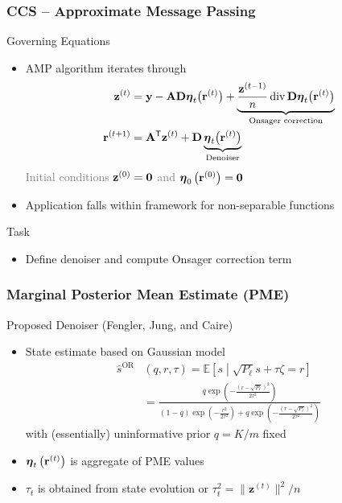 \begin{frame}
\frametitle{CCS -- Approximate Message Passing}
\begin{block}{Governing Equations}
\begin{itemize}
\item AMP algorithm iterates through
\begin{align*}
\mathbf{z}^{(t)} &= \mathbf{y} - \mathbf{A} \mathbf{D} \boldsymbol{\eta}_t \big( \mathbf{r}^{(t)} \big)
+ \underbrace{\frac{\mathbf{z}^{(t-1)}}{n} \operatorname{div} \mathbf{D} \boldsymbol{\eta}_t \big( \mathbf{r}^{(t)} \big)}_{\text{Onsager correction}} \\
\mathbf{r}^{(t+1)} &= \mathbf{A}^{\mathsf{T}} \mathbf{z}^{(t)} + \mathbf{D}
\underbrace{\boldsymbol{\eta}_t \big( \mathbf{r}^{(t)} \big)}_{\text{Denoiser}}
\end{align*}
\textcolor{gray}{Initial conditions $\mathbf{z}^{(0)} = \mathbf{0}$ and $\boldsymbol{\eta}_0 \left( \mathbf{r}^{(0)} \right) = \mathbf{0}$}
\item Application falls within framework for non-separable functions
\end{itemize}
\end{block}
\vfill
\begin{exampleblock}{Task}
\begin{itemize}
\item Define denoiser and compute Onsager correction term
\end{itemize}
\end{exampleblock}
\end{frame}


\begin{frame}
\frametitle{Marginal Posterior Mean Estimate (PME)}
\begin{block}{Proposed Denoiser (Fengler, Jung, and Caire)}
\begin{itemize}
\item State estimate based on Gaussian model
\begin{equation*}
\begin{split}
\hat{s}^{\mathrm{OR}} & \left( q, r, \tau \right)
= \mathbb{E} \left[ s \middle| \sqrt{P_{\ell}} s + \tau \zeta = r \right] \\
&= \frac{q \exp \left( - \frac{ \left( r - \sqrt{P_{\ell}} \right)^2}{2 \tau^2} \right)}
{(1-q) \exp \left( -\frac{r^2}{2 \tau^2} \right)
+ q \exp \left( - \frac{ \left( r - \sqrt{P_{\ell}} \right)^2}{2 \tau^2} \right)}
\end{split}
\end{equation*}
with (essentially) uninformative prior $q = K/m$ fixed
\item $\boldsymbol{\eta}_t \left( \mathbf{r}^{(t)} \right)$ is aggregate of PME values
\item $\tau_t$ is obtained from state evolution or $\tau_t^2 = {\| \mathbf{z}^{(t)} \|^2}/{n}$
\end{itemize}
\end{block}
\end{frame}

